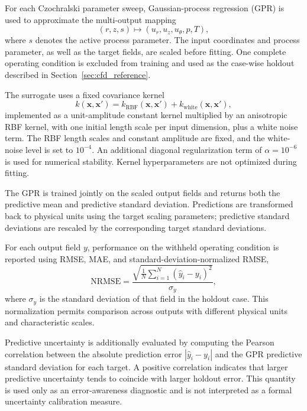 \documentclass{article}
\begin{document}
For each Czochralski parameter sweep, Gaussian-process regression (GPR) is used to approximate the multi-output mapping
\begin{equation}
    (r,z,s)\mapsto(u_r,u_z,u_\theta,p,T),
\end{equation}
where $s$ denotes the active process parameter. The input coordinates and process parameter, as well as the target fields, are scaled before fitting. One complete operating condition is excluded from training and used as the case-wise holdout described in Section~\ref{sec:cfd_reference}.

The surrogate uses a fixed covariance kernel
\begin{equation}
    k(\mathbf{x},\mathbf{x}') = k_{\mathrm{RBF}}(\mathbf{x},\mathbf{x}')
    + k_{\mathrm{white}}(\mathbf{x},\mathbf{x}'),
\end{equation}
implemented as a unit-amplitude constant kernel multiplied by an anisotropic RBF kernel, with one initial length scale per input dimension, plus a white noise term. The RBF length scales and constant amplitude are fixed, and the white-noise level is set to $10^{-4}$. An additional diagonal regularization term of $\alpha=10^{-6}$ is used for numerical stability. Kernel hyperparameters are not optimized during fitting.

The GPR is trained jointly on the scaled output fields and returns both the predictive mean and predictive standard deviation. Predictions are transformed back to physical units using the target scaling parameters; predictive standard deviations are rescaled by the corresponding target standard deviations.

For each output field $y$, performance on the withheld operating condition is reported using RMSE, MAE, and standard-deviation-normalized RMSE,
\begin{equation}
    \mathrm{NRMSE} = \frac{\sqrt{\frac{1}{N}\sum_{i=1}^{N} (\hat{y}_i-y_i)^2}
    }{
        \sigma_y
    },
\end{equation}
where $\sigma_y$ is the standard deviation of that field in the holdout case. This normalization permits comparison across outputs with different physical units and characteristic scales.

Predictive uncertainty is additionally evaluated by computing the Pearson correlation between the absolute prediction error $|\hat{y}_i-y_i|$ and the GPR predictive standard deviation for each target. A positive correlation indicates that larger predictive uncertainty tends to coincide with larger holdout error. This quantity is used only as an error-awareness diagnostic and is not interpreted as a formal uncertainty calibration measure.
\end{document}
